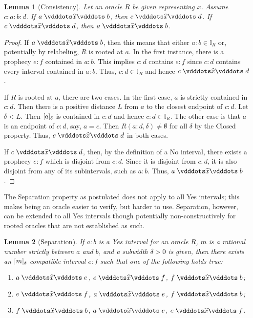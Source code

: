 \documentclass[12pt]{article}
\newtheorem{lemma}{Lemma}[section]
\begin{document}
\begin{lemma}[Consistency]\label{os:con}
    Let an oracle $R$ be given representing $x$. Assume $c:a:b:d$. If $a \xora b$, then $c \xora d$. If \sout{$c \xora d$}, then \sout{$a \xora b$}. 
\end{lemma}

\begin{proof}
    If $a \xora b$, then this means that either $a:b \in \mathbb{I}_R$ or, potentially by relabeling, $R$ is rooted at $a$. In the first instance, there is a prophecy $e:f$ contained in $a:b$. This implies $c:d$ contains $e:f$ since $c:d$ contains every interval contained in $a:b$. Thus, $c:d \in \mathbb{I}_R$ and hence $c \xora d$. 
    
    If $R$ is rooted at $a$, there are two cases. In the first case, $a$ is strictly contained in $c:d$. Then there is a positive distance $L$ from $a$ to the closest endpoint of $c:d$. Let $\delta < L$. Then $[a]_{\delta}$ is contained in $c:d$ and hence $c:d \in \mathbb{I}_R$. The other case is that $a$ is an endpoint of $c:d$, say, $ a= c$. Then $R(a:d, \delta) \neq \emptyset$ for all $\delta$ by the Closed property. Thus, $c \xora d$ in both cases.  

    If \sout{$c \xora d$}, then, by the definition of a No interval, there exists a prophecy $e:f$ which is disjoint from $c:d$. Since it is disjoint from $c:d$, it is also disjoint from any of its subintervals, such as $a:b$. Thus, \sout{$a \xora b$}.    
\end{proof}

The Separation property as postulated does not apply to all Yes intervals; this makes being an oracle easier to verify, but harder to use. Separation, however, can be extended to all Yes intervals though potentially non-constructively for rooted oracles that are not established as such.

\begin{lemma}[Separation]
    If $a: b$ is a Yes interval for an oracle $R$, $m$ is a rational number strictly between $a$ and $b$, and a subwidth $\delta > 0$ is given, then there exists an $[m]_{\delta}$ compatible interval $e:f$ such that one of the following holds true:
    \begin{enumerate}
        \item $a \xora e$, \sout{$e\xora f$}, \sout{$f\xora b$};
        \item $e \xora f$, \sout{$a\xora e$}, \sout{$f\xora b$};
        \item $f \xora b$, \sout{$a\xora e$}, \sout{$e\xora f$}.
    \end{enumerate}
\end{lemma}
\end{document}
